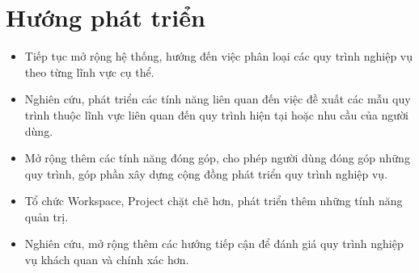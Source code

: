 \section{Hướng phát triển}
\begin{itemize}
    \item Tiếp tục mở rộng hệ thống, hướng đến việc phân loại các quy trình nghiệp vụ theo từng lĩnh vực cụ thể.
    \item Nghiên cứu, phát triển các tính năng liên quan đến việc đề xuất các mẫu quy trình thuộc lĩnh vực liên quan đến quy trình hiện tại hoặc nhu cầu của người dùng.
    \item Mở rộng thêm các tính năng đóng góp, cho phép người dùng đóng góp những quy trình, góp phần xây dựng cộng đồng phát triển quy trình nghiệp vụ.
    \item Tổ chức Workspace, Project chặt chẽ hơn, phát triển thêm những tính năng quản trị.
    \item Nghiên cứu, mở rộng thêm các hướng tiếp cận để đánh giá quy trình nghiệp vụ khách quan và chính xác hơn.
\end{itemize}


